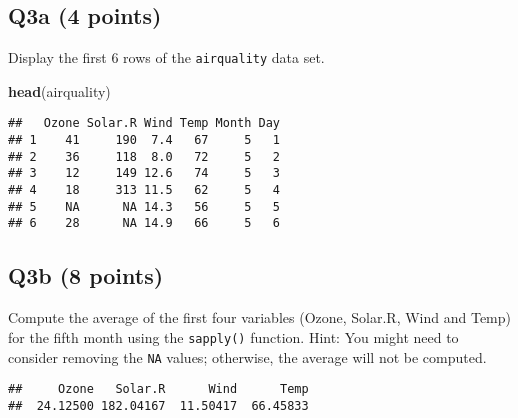 \documentclass[
]{article}
\newenvironment{Shaded}{\begin{snugshade}}{\end{snugshade}}
\newcommand{\DecValTok}[1]{\textcolor[rgb]{0.00,0.00,0.81}{#1}}
\newcommand{\FunctionTok}[1]{\textcolor[rgb]{0.13,0.29,0.53}{\textbf{#1}}}
\newcommand{\NormalTok}[1]{#1}
\newcommand{\OtherTok}[1]{\textcolor[rgb]{0.56,0.35,0.01}{#1}}
\newcommand{\SpecialCharTok}[1]{\textcolor[rgb]{0.81,0.36,0.00}{\textbf{#1}}}
\begin{document}
\hypertarget{q3a-4-points}{%
\subsection{Q3a (4 points)}\label{q3a-4-points}}

Display the first 6 rows of the \texttt{airquality} data set.

\begin{Shaded}
\begin{Highlighting}[]
\FunctionTok{head}\NormalTok{(airquality)}
\end{Highlighting}
\end{Shaded}

\begin{verbatim}
##   Ozone Solar.R Wind Temp Month Day
## 1    41     190  7.4   67     5   1
## 2    36     118  8.0   72     5   2
## 3    12     149 12.6   74     5   3
## 4    18     313 11.5   62     5   4
## 5    NA      NA 14.3   56     5   5
## 6    28      NA 14.9   66     5   6
\end{verbatim}

\hypertarget{q3b-8-points}{%
\subsection{Q3b (8 points)}\label{q3b-8-points}}

Compute the average of the first four variables (Ozone, Solar.R, Wind
and Temp) for the fifth month using the \texttt{sapply()} function.
Hint: You might need to consider removing the \texttt{NA} values;
otherwise, the average will not be computed.

\begin{Shaded}
\end{Shaded}

\begin{verbatim}
##     Ozone   Solar.R      Wind      Temp 
##  24.12500 182.04167  11.50417  66.45833
\end{verbatim}
\end{document}
